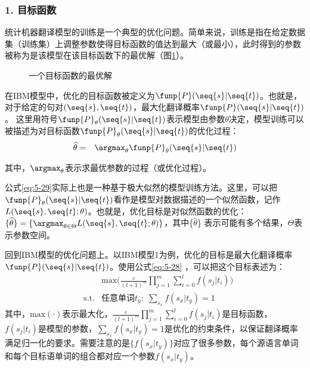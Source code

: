 
\subsubsection{1. 目标函数}

\parinterval 统计机器翻译模型的训练是一个典型的优化问题。简单来说，训练是指在给定数据集（训练集）上调整参数使得目标函数的值达到最大（或最小），此时得到的参数被称为是该模型在该目标函数下的最优解（图\ref{fig:5-22}）。

\begin{figure}[htp]
    \centering

   \caption{一个目标函数的最优解}
   \label{fig:5-22}
\end{figure}

\parinterval 在IBM模型中，优化的目标函数被定义为$\funp{P}(\seq{s}| \seq{t})$。也就是，对于给定的句对$(\seq{s},\seq{t})$，最大化翻译概率$\funp{P}(\seq{s}| \seq{t})$。 这里用符号$\funp{P}_{\theta}(\seq{s}|\seq{t})$表示模型由参数$\theta$决定，模型训练可以被描述为对目标函数$\funp{P}_{\theta}(\seq{s}|\seq{t})$的优化过程：
\begin{eqnarray}
\widehat{\theta}&=&\argmax_{\theta}\funp{P}_{\theta}(\seq{s}|\seq{t})
\label{eq:5-29}
\end{eqnarray}

\noindent 其中，$\argmax_{\theta}$表示求最优参数的过程（或优化过程）。

\parinterval 公式\eqref{eq:5-29}实际上也是一种基于极大似然的模型训练方法。这里，可以把$\funp{P}_{\theta}(\seq{s}|\seq{t})$看作是模型对数据描述的一个似然函数，记作$L(\seq{s},\seq{t};\theta)$。也就是，优化目标是对似然函数的优化：$\{\widehat{\theta}\}=\{\argmax_{\theta \in \Theta}L(\seq{s},\seq{t};\theta)\}$，其中\{$\widehat{\theta}$\} 表示可能有多个结果，$\Theta$表示参数空间。

\parinterval 回到IBM模型的优化问题上。以IBM模型1为例，优化的目标是最大化翻译概率$\funp{P}(\seq{s}| \seq{t})$。使用公式\eqref{eq:5-28} ，可以把这个目标表述为：
\begin{eqnarray}
&                    & \textrm{max}\Big(\frac{\varepsilon}{(l+1)^m}\prod_{j=1}^{m}\sum_{i=0}^{l}{f({s_j|t_i})}\Big) \nonumber \\
& \textrm{s.t.} & \textrm{任意单词} t_{y}:\;\sum_{s_x}{f(s_x|t_y)} = 1 \nonumber
\label{eq:5-29-30}
\end{eqnarray}
\noindent 其中，$\textrm{max}(\cdot)$表示最大化，$\frac{\varepsilon}{(l+1)^m}\prod_{j=1}^{m}\sum_{i=0}^{l}{f({s_j|t_i})}$是目标函数，$f({s_j|t_i})$是模型的参数，$\sum_{s_x}{f(s_x|t_y)}=1$是优化的约束条件，以保证翻译概率满足归一化的要求。需要注意的是$\{f(s_x |t_y)\}$对应了很多参数，每个源语言单词和每个目标语单词的组合都对应一个参数$f(s_x |t_y)$。

